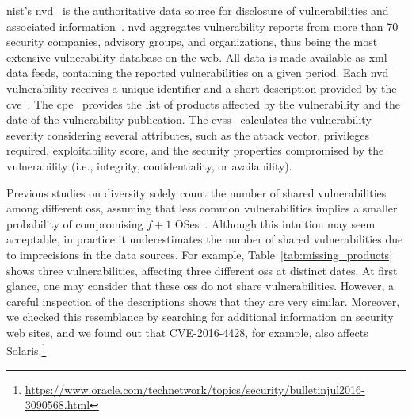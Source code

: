 \gls{nist}'s \gls{nvd}~\cite{nvd} is the authoritative data source for disclosure of vulnerabilities and associated information~\cite{Massacci:2010}. 
\gls{nvd} aggregates vulnerability reports from more than 70 security companies, advisory groups, and organizations, thus being the most extensive vulnerability database on the web. 
All data is made available as \gls{xml} data feeds, containing the reported vulnerabilities on a given period. 
Each \gls{nvd} vulnerability receives a unique identifier and a short description provided by the \gls{cve}~\cite{cveterm}. 
The \gls{cpe}~\cite{cpe} provides the list of products affected by the vulnerability and the date of the vulnerability publication.
The \gls{cvss}~\cite{cvss} calculates the vulnerability severity considering several attributes, such as the attack vector, privileges required, exploitability score, and the security properties compromised by the vulnerability (i.e., integrity, confidentiality, or availability).

Previous studies on diversity solely count the number of shared vulnerabilities among different \glspl{os}, assuming that less common vulnerabilities implies a smaller probability of compromising $f+1$ OSes~\cite{Garcia:2014}. 
Although this intuition may seem acceptable, in practice it underestimates the number of shared vulnerabilities due to imprecisions in the data sources. 
For example, Table~\ref{tab:missing_products} shows three vulnerabilities, affecting three different \glspl{os} at distinct dates.
At first glance, one may consider that these \glspl{os} do not share vulnerabilities.
However, a careful inspection of the descriptions shows that they are very similar.
Moreover, we checked this resemblance by searching for additional information on security web sites, and we found out that CVE-2016-4428, for example, also affects Solaris.\footnote{\url{https://www.oracle.com/technetwork/topics/security/bulletinjul2016-3090568.html}}

